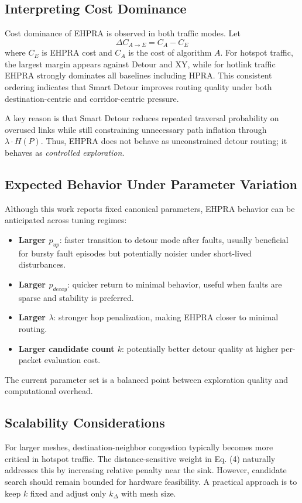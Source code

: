\documentclass[10pt,a4paper]{article}
\begin{document}
\subsection{Interpreting Cost Dominance}
Cost dominance of EHPRA is observed in both traffic modes. Let
\begin{equation}
\Delta C_{A\rightarrow E}=C_A-C_E
\end{equation}
where $C_E$ is EHPRA cost and $C_A$ is the cost of algorithm $A$. For hotspot traffic, the largest margin appears against Detour and XY, while for hotlink traffic EHPRA strongly dominates all baselines including HPRA. This consistent ordering indicates that Smart Detour improves routing quality under both destination-centric and corridor-centric pressure.

A key reason is that Smart Detour reduces repeated traversal probability on overused links while still constraining unnecessary path inflation through $\lambda\cdot H(P)$. Thus, EHPRA does not behave as unconstrained detour routing; it behaves as \emph{controlled exploration}.

\subsection{Expected Behavior Under Parameter Variation}
Although this work reports fixed canonical parameters, EHPRA behavior can be anticipated across tuning regimes:
\begin{itemize}[leftmargin=6mm]
    \item \textbf{Larger $p_{up}$}: faster transition to detour mode after faults, usually beneficial for bursty fault episodes but potentially noisier under short-lived disturbances.
    \item \textbf{Larger $p_{decay}$}: quicker return to minimal behavior, useful when faults are sparse and stability is preferred.
    \item \textbf{Larger $\lambda$}: stronger hop penalization, making EHPRA closer to minimal routing.
    \item \textbf{Larger candidate count $k$}: potentially better detour quality at higher per-packet evaluation cost.
\end{itemize}
The current parameter set is a balanced point between exploration quality and computational overhead.

\subsection{Scalability Considerations}
For larger meshes, destination-neighbor congestion typically becomes more critical in hotspot traffic. The distance-sensitive weight in Eq. (4) naturally addresses this by increasing relative penalty near the sink. However, candidate search should remain bounded for hardware feasibility. A practical approach is to keep $k$ fixed and adjust only $k_\Delta$ with mesh size.
\end{document}
